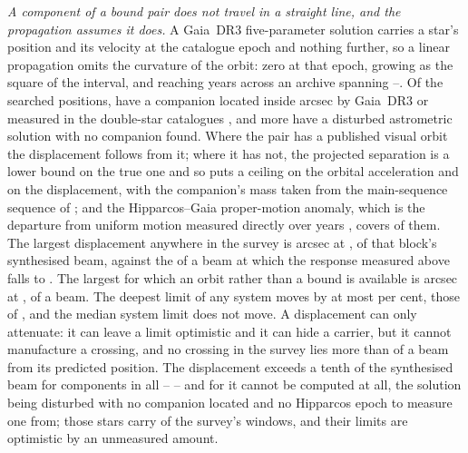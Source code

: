 \emph{A component of a bound pair does not travel in a straight line, and the
propagation assumes it does.} A Gaia~DR3 five-parameter solution carries a
star's position and its velocity at the catalogue epoch and nothing further,
so a linear propagation omits the curvature of the orbit: zero at that epoch,
growing as the square of the interval, and reaching years across an archive
spanning \OmEpochLo--\OmEpochHi. Of the \OmNStar{} searched positions,
\OmNComponent{} have a companion located inside \OmRadius{} arcsec by
Gaia~DR3 or measured in the double-star catalogues
\citep{wds,orb6}, and \OmNIndOnly{} more
have a disturbed astrometric solution with no companion found. Where the pair
has a published visual orbit the displacement follows from it; where it has
not, the projected separation is a lower bound on the true one and so puts a
ceiling on the orbital acceleration and on the displacement, with the
companion's mass taken from the main-sequence sequence of
\citet{pecaut2013}; and the
Hipparcos--Gaia proper-motion anomaly, which is the departure from uniform
motion measured directly over \OmHGInterval{} years
\citep{kervella2022}, covers \OmNPma{} of
them. The largest displacement anywhere in the survey is \OmWorstArcsec{}
arcsec at \OmWorstStar, \OmWorstBeams{} of that block's synthesised beam,
against the \SensPxLargeBeams{} of a beam at which the response measured
above falls to \SensPxLargePred. The largest for which an orbit rather than a
bound is available is
\OmMeasArcsec{} arcsec at \OmMeasStar, \OmMeasBeams{} of a beam. The deepest
limit of any system moves by at most \OmSysMovedMaxPct{} per cent, those of
\OmSysMovedStars, and the median system limit does not move. A displacement
can only attenuate: it can leave a limit optimistic and it can hide a
carrier, but it cannot manufacture a crossing, and no crossing in the survey
lies more than \OmCrossWorstBeams{} of a beam from its predicted position.
The displacement exceeds a tenth of the synthesised beam for \OmNTenth{}
components in all -- \OmTenthStars{} -- and for \OmFlagStars{} it cannot be
computed at all, the solution being disturbed with no companion located and no
Hipparcos epoch to measure one from; those \OmNFlag{} stars carry
\OmNWinFlag{} of the survey's windows, and their limits are optimistic by an
unmeasured amount.

